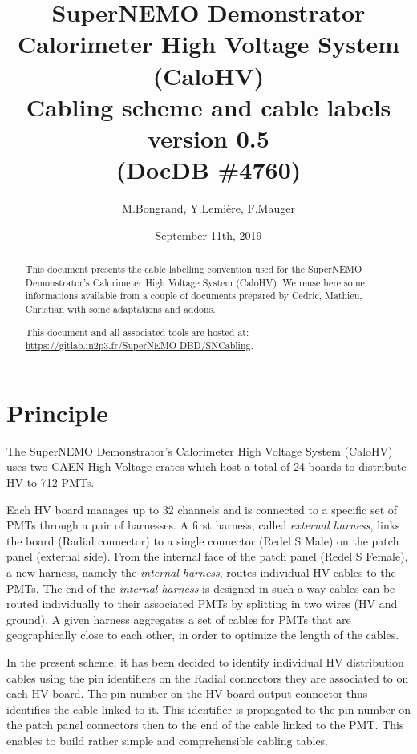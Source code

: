\documentclass[12pt,a4paper]{article}
\title{SuperNEMO Demonstrator\\
  Calorimeter High Voltage System (CaloHV)\\
  Cabling scheme and cable labels\\
  version 0.5\\
(DocDB \#4760)}
\author{M.Bongrand, Y.Lemi\`ere, F.Mauger}
\date{September 11th, 2019}
\begin{document}
\maketitle

\begin{abstract}
  \noindent This document presents the cable labelling convention used
  for  the SuperNEMO  Demonstrator's Calorimeter  High Voltage  System
  (CaloHV).  We reuse  here some informations available  from a couple
  of documents prepared  by Cedric, Mathieu, Christian  with some adaptations
  and addons.

  \vskip 10pt
  \noindent This document and all associated tools
  are hosted at:
  \vskip 5pt
  \url{https://gitlab.in2p3.fr/SuperNEMO-DBD/SNCabling}.
  
\end{abstract}

\tableofcontents
\vfill

\clearpage
\section{Principle}

The SuperNEMO Demonstrator's Calorimeter  High Voltage System (CaloHV)
uses two CAEN High  Voltage crates which host a total  of 24 boards to
distribute HV to 712 PMTs.

Each HV board manages up to 32 channels and is connected to a specific
set of  PMTs through  a pair  of harnesses.   A first  harness, called
\emph{external  harness},  links the  board  (Radial  connector) to  a
single  connector  (Redel  S  Male)   on  the  patch  panel  (external
side). From the  internal face of the patch panel  (Redel S Female), a
new harness, namely the  \emph{internal harness}, routes individual HV
cables  to  the PMTs.   The  end  of  the \emph{internal  harness}  is
designed in  such a  way cables  can be  routed individually  to their
associated PMTs  by splitting in two  wires (HV and ground).   A given
harness aggregates  a set of  cables for PMTs that  are geographically
close to each other, in order to optimize the length of the cables.

In the present  scheme, it has been decided to  identify individual HV
distribution cables using the pin identifiers on the Radial connectors
they are  associated to on  each HV board.  The  pin number on  the HV
board output connector  thus identifies the cable linked  to it.  This
identifier  is  propagated  to  the  pin number  on  the  patch  panel
connectors  then to  the end  of the  cable linked  to the  PMT.  This
enables to build rather simple and comprehensible cabling tables.
\end{document}
